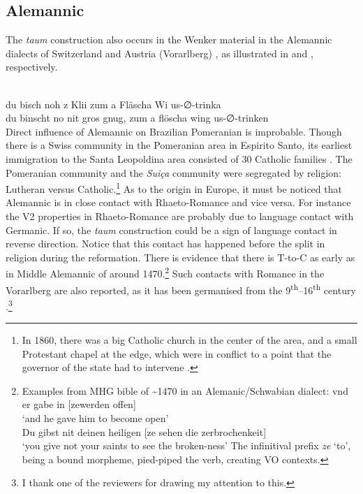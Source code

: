 \documentclass[output=paper,hidelinks,draftmode]{langscibook}
\begin{document}
\subsection{Alemannic}

The \textit{taum} construction also occurs in the Wenker material in the Alemannic dialects of Switzerland and Austria (Vorarlberg) \citep{Seiler2005}, as illustrated in  and , respectively.


\ea {}\\
\ea\label{ex:postma:11a} du bisch noh z Klii zum a Fläscha Wi us-∅-trinka\\
\ex\label{ex:postma:11b} du binscht no nit gros gnug, zum a flöscha wing us-∅-trinken\\
\z\z
Direct influence of Alemannic on Brazilian Pomeranian is improbable. Though there is a Swiss community in the Pomeranian area in Espirito Santo, its earliest immigration to the Santa Leopoldina area consisted of 30 Catholic families \citep[155]{Franceschetto2014}. The Pomeranian community and the \textit{Suiça} community were segregated by religion: Lutheran versus Catholic.\footnote{In 1860, there was a big Catholic church in the center of the area, and a small Protestant chapel at the edge, which were in conflict to a point that the governor of the state had to intervene \citep[139]{Tschudi1860}.} As to the origin in Europe, it must be noticed that Alemannic is in close contact with Rhaeto-Romance and vice versa. For instance the V2 properties in Rhaeto-Romance are probably due to language contact with Germanic. If so, the \textit{taum} construction could be a sign of language contact in reverse direction. Notice that this contact has happened before the split in religion during the reformation. There is evidence that there is T-to-C as early as in Middle Alemannic of around 1470.\footnote{Examples from MHG bible of {\textasciitilde}1470 in an Alemanic/Schwabian dialect: 
\ea vnd er gabe in [zewerden offen]\\ 
\glt `and he gave him to become open' \\
\ex Du gibst nit deinen heiligen [ze sehen die zerbrochenkeit]\\ 
\glt `you give not your saints to see the broken-ness'
\z 
The infinitival prefix \textit{ze} `to', being a bound morpheme, pied-piped the verb, creating VO contexts.} Such contacts with Romance in the Vorarlberg are also reported, as it has been germanised from the 9\textsuperscript{th}–16\textsuperscript{th} century \citep[4]{Klausmann1995}.\footnote{I thank one of the reviewers for drawing my attention to this.}
\end{document}
